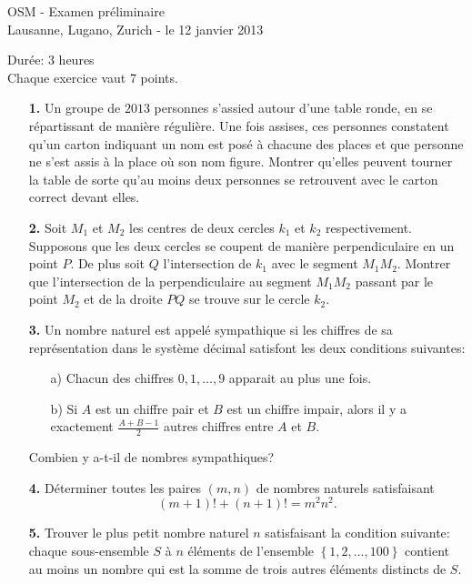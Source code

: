 \documentclass[11pt,a4paper]{article}
\begin{document}
\pagestyle{empty}

\begin{center}
{\huge OSM - Examen préliminaire} \\
\medskip Lausanne, Lugano, Zurich - le 12 janvier 2013
\end{center}
\vspace{8mm}
Durée: 3 heures\\
Chaque exercice vaut 7 points.

\vspace{15mm}

\begin{enumerate}

\item[\textbf{1.}] 
Un groupe de $2013$ personnes s'assied autour d'une table ronde, en se répartissant de manière régulière. Une fois assises, ces personnes constatent qu'un carton indiquant un nom est posé à chacune des places et que personne ne s'est assis à la place où son nom figure. Montrer qu'elles peuvent tourner la table de sorte qu'au moins deux personnes se retrouvent avec le carton correct devant elles.

\bigskip

\item[\textbf{2.}] 
Soit $M_1$ et $M_2$ les centres de deux cercles $k_1$ et $k_2$ respectivement. Supposons que les deux cercles se coupent de manière perpendiculaire en un point $P$. De plus soit $Q$ l'intersection de $k_1$ avec le segment $M_1M_2$. Montrer que l'intersection de la perpendiculaire au segment $M_1M_2$ passant par le point $M_2$ et de la droite $PQ$ se trouve sur le cercle $k_2$.

\bigskip

\item[\textbf{3.}]
Un nombre naturel est appelé sympathique si les chiffres de sa représentation dans le système décimal satisfont les deux conditions suivantes:
\begin{enumerate}
\item[a)] Chacun des chiffres $0,1,\ldots, 9$ apparait au plus une fois.
\item[b)] Si $A$ est un chiffre pair et $B$ est un chiffre impair, alors il y a exactement $\frac{A+B-1}{2}$ autres chiffres entre $A$ et $B$.
\end{enumerate}
Combien y a-t-il de nombres sympathiques?

\bigskip

\item[\textbf{4.}] 
Déterminer toutes les paires $(m,n)$ de nombres naturels satisfaisant
\[(m+1)! + (n+1)! = m^2n^2.\]

\bigskip


\item[\textbf{5.}] 
Trouver le plus petit nombre naturel $n$ satisfaisant la condition suivante: chaque sous-ensemble $S$ à $n$ éléments de l'ensemble $\left\{1,2,\ldots,100\right\}$ contient au moins un nombre qui est la somme de trois autres éléments distincts de $S$.

\bigskip

\end{enumerate}


\vspace{1.5cm} 

\end{document}
